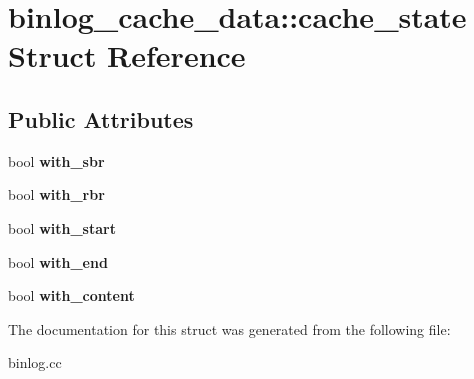 \hypertarget{structbinlog__cache__data_1_1cache__state}{}\section{binlog\+\_\+cache\+\_\+data\+:\+:cache\+\_\+state Struct Reference}
\label{structbinlog__cache__data_1_1cache__state}
\subsection*{Public Attributes}
\begin{DoxyCompactItemize}
\item 
\mbox{\label{structbinlog__cache__data_1_1cache__state_a8f6b897c408e5935838c341657c2b32d}} 
bool {\bfseries with\+\_\+sbr}
\item 
\mbox{\label{structbinlog__cache__data_1_1cache__state_abfb66f0e7064877cfee3ced123ee0e82}} 
bool {\bfseries with\+\_\+rbr}
\item 
\mbox{\label{structbinlog__cache__data_1_1cache__state_ae439787a5b90a3e4b3b81c896802a61f}} 
bool {\bfseries with\+\_\+start}
\item 
\mbox{\label{structbinlog__cache__data_1_1cache__state_ae8a62a8906d2a6769a0b22e1152733ce}} 
bool {\bfseries with\+\_\+end}
\item 
\mbox{\label{structbinlog__cache__data_1_1cache__state_a49b18f23529390dd897a7f15fa025139}} 
bool {\bfseries with\+\_\+content}
\end{DoxyCompactItemize}


The documentation for this struct was generated from the following file\+:\begin{DoxyCompactItemize}
\item 
binlog.\+cc\end{DoxyCompactItemize}
